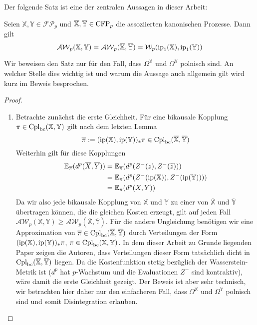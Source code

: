 Der folgende Satz ist eine der zentralen Aussagen in dieser Arbeit: 
\begin{theorem}\label{thm:adapted_wasserstein_equalities}     
    Seien $\mathbb{X}, \mathbb{Y} \in \mathcal{FP}_p$ und $\overline{\mathbb{X}}, \overline{\mathbb{Y}} \in \operatorname{CFP}_p$ die assoziierten kanonischen Prozesse. Dann gilt
    $$\mathcal{AW}_p(\mathbb{X}, \mathbb{Y}) = \mathcal{AW}_p(\overline{\mathbb{X}}, \overline{\mathbb{Y}}) = \mathcal{W}_p(\operatorname{ip}_1(\mathbb{X}), \operatorname{ip}_1(\mathbb{Y}))$$
\end{theorem}
Wir beweisen den Satz nur für den Fall, dass $\Omega^\mathbb{X}$ und $\Omega^\mathbb{Y}$ polnisch sind. An welcher Stelle dies wichtig ist und warum die Aussage auch allgemein gilt wird kurz im Beweis besprochen.
\begin{proof}
\begin{enumerate}
\item Betrachte zunächst die erste Gleichheit. Für eine bikausale Kopplung $\pi \in \operatorname{Cpl}_{\operatorname{bc}}(\mathbb{X}, \mathbb{Y})$ gilt nach dem letzten Lemma 
$$\overline{\pi}:=(\operatorname{ip}(\mathbb{X}), \operatorname{ip}(\mathbb{Y}))_*\pi \in \operatorname{Cpl}_{\operatorname{bc}}(\overline{\mathbb{X}}, \overline{\mathbb{Y}})$$
Weiterhin gilt für diese Kopplungen
\begin{align*}
    \mathbb{E}_{\overline{\pi}}(d^p(\overline{X}, \overline{Y}))&=\mathbb{E}_{\overline{\pi}}(d^p(Z^-(z), Z^-(\widetilde{z}))) \\
    &= \mathbb{E}_\pi(d^p(Z^-(\operatorname{ip}(\mathbb{X})), Z^-(\operatorname{ip}(\mathbb{Y})))) \\
    &= \mathbb{E}_\pi(d^p(X, Y))
\end{align*}
Da wir also jede bikausale Kopplung von $\mathbb{X}$ und $\mathbb{Y}$ zu einer von $\overline{\mathbb{X}}$ und $\overline{\mathbb{Y}}$ übertragen können, die die gleichen Kosten erzeugt, gilt auf jeden Fall \\
$\mathcal{AW}_p(\mathbb{X}, \mathbb{Y}) \geq \mathcal{AW}_p(\overline{\mathbb{X}}, \overline{\mathbb{Y}})$. Für die andere Ungleichung benötigen wir eine Approximation von $\overline{\pi} \in \operatorname{Cpl}_{\operatorname{bc}}(\overline{\mathbb{X}}, \overline{\mathbb{Y}})$ durch Verteilungen der Form $(\operatorname{ip}(\mathbb{X}), \operatorname{ip}(\mathbb{Y}))_*\pi$, $\pi \in \operatorname{Cpl}_{\operatorname{bc}}(\mathbb{X}, \mathbb{Y})$. In dem dieser Arbeit zu Grunde liegenden Paper zeigen die Autoren, dass Verteilungen dieser Form tatsächlich dicht in $\operatorname{Cpl}_{\operatorname{bc}}(\overline{\mathbb{X}}, \overline{\mathbb{Y}})$ liegen. Da die Kostenfunktion stetig bezüglich der Wasserstein-Metrik ist ($d^p$ hat $p$-Wachstum und die Evaluationen $Z^-$ sind kontraktiv), wäre damit die erste Gleichheit gezeigt. Der Beweis ist aber sehr technisch, wir betrachten hier daher nur den einfacheren Fall, dass $\Omega^\mathbb{X}$ und $\Omega^\mathbb{Y}$ polnisch sind und somit Disintegration erlauben. 


\end{enumerate}
\end{proof}
